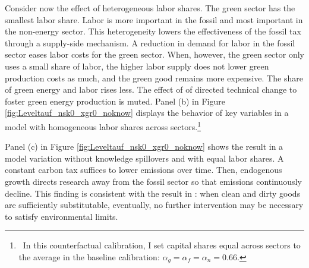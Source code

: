 Consider now the effect of heterogeneous labor shares. The green sector has the smallest labor share. Labor is more important in the fossil and most important in the non-energy sector. This heterogeneity lowers the effectiveness of the fossil tax through a supply-side mechanism. 
 A reduction in demand for labor in the fossil sector eases labor costs for the green sector. When, however, the green sector only uses a small share of labor, the higher labor supply does not lower green production costs as much, and the green good remains more expensive. The share of green energy and labor rises less. The effect of of directed technical change to foster green energy production is muted. 
 Panel (b) in Figure \ref{fig:Leveltauf_nsk0_xgr0_noknow} displays the behavior of key variables in a model with homogeneous labor shares across sectors.\footnote{\ In this counterfactual calibration, I set capital shares equal across sectors to the average in the baseline calibration: $\alpha_g=\alpha_f=\alpha_n=0.66$. } 





Panel (c) in Figure \ref{fig:Leveltauf_nsk0_xgr0_noknow} shows the result in a model variation without knowledge spillovers and with equal labor shares. A constant carbon tax suffices to lower emissions over time. Then, endogenous growth directs research away from the fossil sector so that emissions continuously decline.  This finding is consistent with the result in \cite{Acemoglu2012TheChange}:  when clean and dirty goods are sufficiently substitutable, eventually, no further intervention may be necessary to satisfy environmental limits. %

